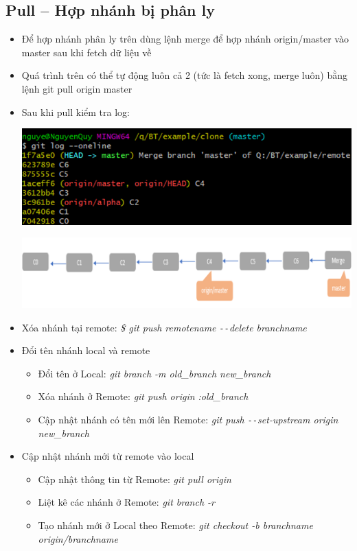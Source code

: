 \documentclass[12pt,a4paper]{report}
\begin{document}
\subsection{Pull – Hợp nhánh bị phân ly}
\begin{itemize}
\item Để hợp nhánh phân ly trên dùng lệnh merge để hợp nhánh origin/master vào master sau khi fetch dữ liệu về
\item Quá trình trên có thể tự động luôn cả 2 (tức là fetch xong, merge luôn) bằng lệnh git pull origin master
\item  Sau khi pull kiểm tra log:
 
 \includegraphics[width=0.8\linewidth]{screenshot076}
 	\label{fig:screenshot076}

 	\includegraphics[width=0.8\linewidth]{screenshot077}

 	\label{fig:screenshot077}

\item Xóa nhánh tại remote: {\it \hspace{1cm} \$ git push remotename \texttt{-{}-}delete branchname}
 
\item Đổi tên nhánh local và remote
\begin{itemize}
	\item Đổi tên ở Local: {\it git branch -m old\_branch new\_branch}
  	\item Xóa nhánh ở Remote: {\it git push origin :old\_branch}
  	\item Cập nhật nhánh có tên mới lên  Remote: {\it git push \texttt{-{}-}set-upstream origin new\_branch}
\end{itemize}
\item Cập nhật nhánh mới từ remote vào local
 	\begin{itemize}
 	\item Cập nhật thông tin từ Remote: {\it git pull origin}
	\item Liệt kê các nhánh ở Remote: {\it git branch -r}
  	\item Tạo nhánh mới ở Local theo Remote: {\it git checkout -b branchname  origin/branchname}
 \end{itemize}\end{itemize}
\end{document}
